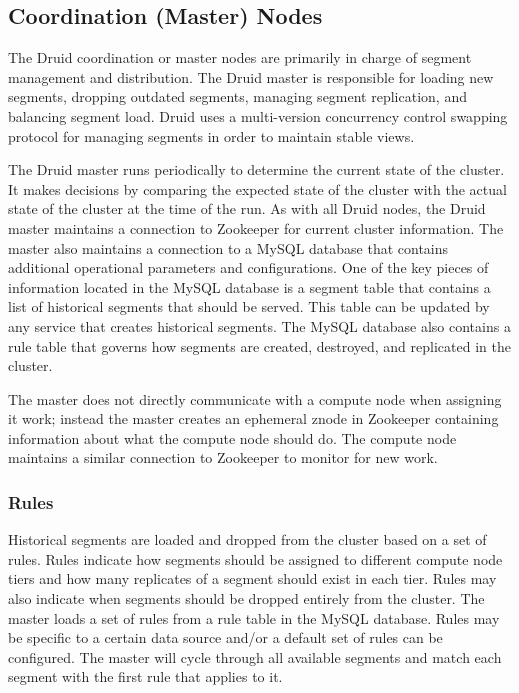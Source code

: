 \documentclass{vldb}
\begin{document}
\subsection{Coordination (Master) Nodes}
The Druid coordination or master nodes are primarily in charge of
segment management and distribution. The Druid master is responsible
for loading new segments, dropping outdated segments, managing segment
replication, and balancing segment load. Druid uses a multi-version
concurrency control swapping protocol for managing segments in order
to maintain stable views.

The Druid master runs periodically to determine the current state of
the cluster. It makes decisions by comparing the expected state of the
cluster with the actual state of the cluster at the time of the
run. As with all Druid nodes, the Druid master maintains a connection
to Zookeeper for current cluster information. The master also
maintains a connection to a MySQL database that contains additional
operational parameters and configurations. One of the key pieces of
information located in the MySQL database is a segment table that
contains a list of historical segments that should be served. This
table can be updated by any service that creates historical
segments. The MySQL database also contains a rule table that governs
how segments are created, destroyed, and replicated in the cluster.

The master does not directly communicate with a compute node when
assigning it work; instead the master creates an ephemeral znode in
Zookeeper containing information about what the compute node should
do. The compute node maintains a similar connection to Zookeeper to
monitor for new work.

\subsubsection{Rules}
Historical segments are loaded and dropped from the cluster based on a
set of rules. Rules indicate how segments should be assigned to
different compute node tiers and how many replicates of a segment
should exist in each tier. Rules may also indicate when segments
should be dropped entirely from the cluster. The master loads a set of
rules from a rule table in the MySQL database. Rules may be specific
to a certain data source and/or a default set of rules can be
configured. The master will cycle through all available segments and
match each segment with the first rule that applies to it.
\end{document}
